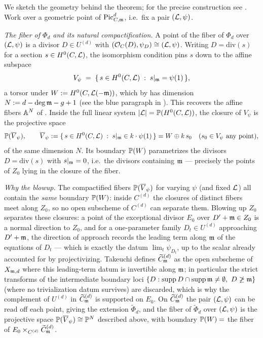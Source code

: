 \begin{bluemath}
\begin{rem*}
We sketch the geometry behind the theorem; for the precise construction see
\cite[Section 3]{takeuchi2018blow}. Work over a geometric point of
$\PicCm[d]$, i.e.\ fix a pair $(\cL, \psi)$.

\emph{The fiber of $\Phi_d$ and its natural compactification.} A point of
the fiber of $\Phi_d$ over $(\cL, \psi)$ is a divisor $D \in U^{(d)}$ with
$(\Oo_C(D), \psi_D) \cong (\cL, \psi)$. Writing $D = \mathrm{div}(s)$ for a
section $s \in H^0(C, \cL)$, the isomorphism condition pins $s$ down to the
affine subspace
\[
V_\psi \;=\; \{\, s \in H^0(C, \cL) \;:\; s|_{\mdls} = \psi(1) \,\},
\]
a torsor under $W := H^0(C, \cL(-\mdls))$, which by
 has dimension $N := d - \deg\mdls - g + 1$
(see the blue paragraph in ). This recovers
the affine fibers $\A^N$ of . Inside the
full linear system $|\cL| = \bP(H^0(C,\cL))$, the closure of $V_\psi$ is the
projective space
\[
\bP(\overline{V}_\psi), \qquad
\overline{V}_\psi := \{\, s \in H^0(C,\cL) \;:\; s|_{\mdls} \in k \cdot \psi(1) \,\}
= W \oplus k\, s_0 \quad (s_0 \in V_\psi \text{ any point}),
\]
of the same dimension $N$. Its boundary $\bP(W)$ parametrizes the divisors
$D = \mathrm{div}(s)$ with $s|_{\mdls} = 0$, i.e.\ the divisors containing
$\mdls$ --- precisely the points of $Z_0$ lying in the closure of the fiber.

\emph{Why the blowup.} The compactified fibers $\bP(\overline{V}_\psi)$ for
varying $\psi$ (and fixed $\cL$) all contain the \emph{same} boundary
$\bP(W)$: inside $C^{(d)}$ the closures of distinct fibers meet along
$Z_0$, so no open subscheme of $C^{(d)}$ can separate them. Blowing up
$Z_0$ separates these closures: a point of the exceptional divisor $E_0$
over $D' + \mdls \in Z_0$ is a normal direction to $Z_0$, and for a
one-parameter family $D_t \in U^{(d)}$ approaching $D' + \mdls$, the
direction of approach records the leading term along $\mdls$ of the
equations of $D_t$ --- which is exactly the datum $\lim_t \psi_{D_t}$, up to
the scalar already accounted for by projectivizing. Takeuchi defines
$\Cmod{d}$ as the open subscheme of $X_{\mdls, d}$ where this leading-term
datum is invertible along $\mdls$; in particular the strict transforms of
the intermediate boundary loci $\{D : \operatorname{supp} D \cap
\operatorname{supp}\mdls \neq \emptyset,\ D \not\geq \mdls\}$ (where no
trivialization datum survives) are discarded, which is why the complement of
$U^{(d)}$ in $\Cmod{d}$ is supported on $E_0$. On $\Cmod{d}$ the pair
$(\cL, \psi)$ can be read off each point, giving the extension
$\tilde{\Phi}_d$, and the fiber of $\tilde{\Phi}_d$ over $(\cL, \psi)$ is
the projective space $\bP(\overline{V}_\psi) \cong \bP^N$ described above,
with boundary $\bP(W) = $ the fiber of $E_0 \times_{C^{(d)}} \Cmod{d}$.
\end{rem*}
\end{bluemath}

